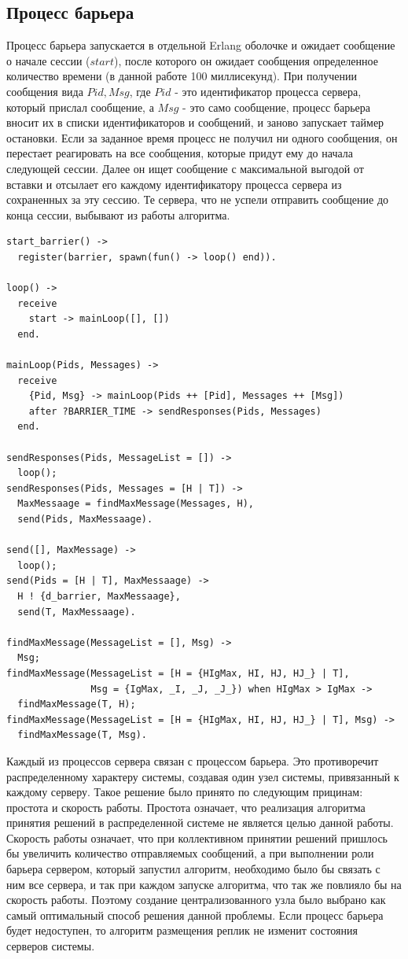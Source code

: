 		\subsection{Процесс барьера}
			Процесс барьера запускается в отдельной Erlang оболочке и ожидает сообщение о начале сессии ($start$), после которого он ожидает сообщения определенное количество времени (в данной 
			работе 100 миллисекунд). При получении сообщения вида ${Pid, Msg}$, где $Pid$ - это идентификатор процесса сервера, который прислал сообщение, а $Msg$ - это само сообщение, процесс барьера 
			вносит их в списки идентификаторов и сообщений, и заново запускает таймер остановки. Если за заданное время процесс не получил ни одного сообщения, он перестает реагировать на все 
			сообщения, которые придут ему до начала следующей сессии. Далее он ищет сообщение с максимальной выгодой от вставки и отсылает его каждому идентификатору процесса сервера из 
			сохраненных за эту сессию. Те сервера, что не успели отправить сообщение до конца сессии, выбывают из работы алгоритма.

			\begin{lstlisting}
start_barrier() -> 
  register(barrier, spawn(fun() -> loop() end)).

loop() ->
  receive
    start -> mainLoop([], [])
  end.

mainLoop(Pids, Messages) ->
  receive
    {Pid, Msg} -> mainLoop(Pids ++ [Pid], Messages ++ [Msg])
	after ?BARRIER_TIME -> sendResponses(Pids, Messages)           
  end.	
  
sendResponses(Pids, MessageList = []) -> 
  loop();
sendResponses(Pids, Messages = [H | T]) ->
  MaxMessaage = findMaxMessage(Messages, H),
  send(Pids, MaxMessaage).

send([], MaxMessage) -> 
  loop();
send(Pids = [H | T], MaxMessaage) ->
  H ! {d_barrier, MaxMessaage},
  send(T, MaxMessaage).

findMaxMessage(MessageList = [], Msg) -> 
  Msg;
findMaxMessage(MessageList = [H = {HIgMax, HI, HJ, HJ_} | T], 
               Msg = {IgMax, _I, _J, _J_}) when HIgMax > IgMax -> 
  findMaxMessage(T, H);
findMaxMessage(MessageList = [H = {HIgMax, HI, HJ, HJ_} | T], Msg) -> 
  findMaxMessage(T, Msg).
			\end{lstlisting}

			Каждый из процессов сервера связан с процессом барьера. Это противоречит распределенному характеру системы, создавая один узел системы, привязанный к каждому серверу. Такое решение 
			было принято по следующим прицинам: простота и скорость работы. Простота означает, что реализация алгоритма принятия решений в распределенной системе не является целью данной работы.
			Скорость работы означает, что при коллективном принятии решений пришлось бы увеличить количество отправляемых сообщений, а при выполнении роли барьера сервером, который запустил 
			алгоритм, необходимо было бы связать с ним все сервера, и так при каждом запуске алгоритма, что так же повлияло бы на скорость работы. Поэтому создание централизованного узла 
			было выбрано как самый оптимальный способ решения данной проблемы. Если процесс барьера будет недоступен, то алгоритм размещения реплик не изменит состояния серверов системы.

